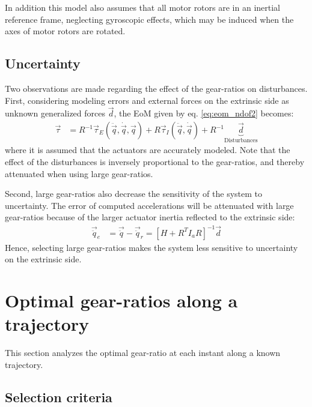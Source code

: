 In addition this model also assumes that all motor rotors are in an inertial reference frame, neglecting gyroscopic effects, which may be induced when the axes of motor rotors are rotated.

\subsection{Uncertainty}
\label{sec:uncertainty}

Two observations are made regarding the effect of the gear-ratios on disturbances. First, considering modeling errors and external forces on the extrinsic side as unknown generalized forces $\vec{d}$, the EoM given by eq. \eqref{eq:eom_ndof2} becomes:
\begin{align}
	\vec{\tau} &= R^{-1} 
	\vec{\tau}_{E}(\ddot{\vec{q}},\dot{\vec{q}},\vec{q}) 
	+ R 
	\vec{\tau}_{I}(\ddot{\vec{q}},\dot{\vec{q}})
    + R^{-1}
    \underbrace{ 
	\vec{d}
	}_{\text{Disturbances}}    
 \label{eq:eom_ndof3}
\end{align}
where it is assumed that the actuators are accurately modeled. Note that the effect of the disturbances is inversely proportional to the gear-ratios, and thereby attenuated when using large gear-ratios. 

Second, large gear-ratios also decrease the sensitivity of the system to uncertainty. The error of computed accelerations will be attenuated with large gear-ratios because of the larger  actuator inertia reflected to the extrinsic side:
\begin{align}
	\vec{\ddot{q}}_e &= \vec{\ddot{q}} - \vec{\ddot{q}}_r = 
	\left[ 
    H + R^T I_a R
	\right]^{-1}
    \vec{d}
 \label{eq:sens}
\end{align}
%
Hence, selecting large gear-ratios makes the system less sensitive to uncertainty on the extrinsic side.





\newpage

\section{Optimal gear-ratios along a trajectory}

This section analyzes the optimal gear-ratio at each instant along a known trajectory. 

\subsection{Selection criteria}
\label{sec:GearSelectionCriteria}

